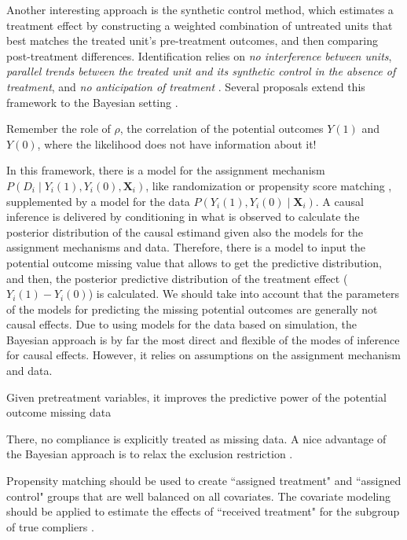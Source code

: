 Another interesting approach is the synthetic control method, which estimates a treatment effect by constructing a weighted combination of untreated units that best matches the treated unit's pre-treatment outcomes, and then comparing post-treatment differences. Identification relies on \textit{no interference between units}, \textit{parallel trends between the treated unit and its synthetic control in the absence of treatment}, and \textit{no anticipation of treatment} \cite{abadie2010synthetic}. Several proposals extend this framework to the Bayesian setting \cite{amjad2018robust,kim2020bayesian,pang2022bayesian}.


Remember the role of $\rho$, the correlation of the potential outcomes $Y(1)$ and $Y(0)$, where the likelihood does not have information about it!

In this framework, there is a model for the assignment mechanism $P(D_i\mid Y_i(1), Y_i(0), \mathbf{X}_i)$, like randomization or propensity score matching \cite{rosenbaum1983central}, supplemented by a model for the data $P(Y_i(1), Y_i(0)\mid \mathbf{X}_i)$. A causal inference is delivered by conditioning in what is observed to calculate the posterior distribution of the causal estimand given also the models for the assignment mechanisms and data. Therefore, there is a model to input the potential outcome missing value that allows to get the predictive distribution, and then, the posterior predictive distribution of the treatment effect ($Y_i(1)-Y_i(0)$) is calculated. We should take into account that the parameters of the models for predicting the missing potential outcomes are generally not causal effects. Due to using models for the data based on simulation, the Bayesian approach is by far the most direct and flexible of the modes of inference for causal effects. However, it relies on assumptions on the assignment mechanism and data.

Given pretreatment variables, it improves the predictive power of the potential outcome missing data

There, no compliance is explicitly treated as missing data. A nice advantage of the Bayesian approach is to relax the exclusion restriction \cite{rubin2004teaching}.

Propensity matching should be used to create ``assigned treatment" and ``assigned control" groups that are well balanced on all covariates. The covariate modeling should be applied to estimate the effects of ``received treatment" for the subgroup of true compliers \cite{rubin2004teaching}.

